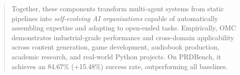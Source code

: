 \documentclass[11pt,a4paper]{article}
\begin{document}
\begin{abstract}
Together, these components transform multi-agent systems from static pipelines into \emph{self-evolving AI organisations} capable of automatically assembling expertise and adapting to open-ended tasks.  
Empirically, OMC demonstrates industrial-grade performance and cross-domain applicability across content generation, game development, audiobook production, academic research, and real-world Python projects. On PRDBench, it achieves an 84.67\% (+15.48\%) success rate, outperforming all baselines.

\end{abstract}

\end{document}
